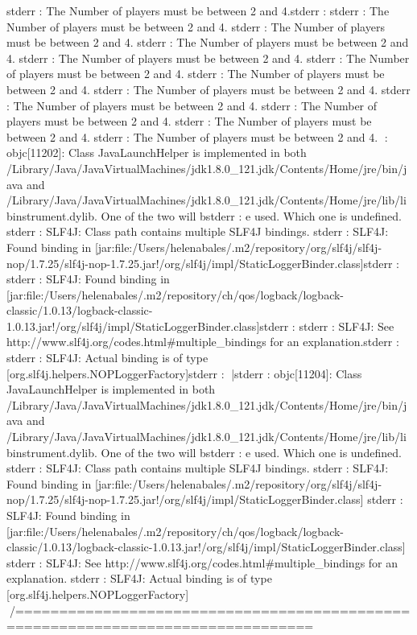 stderr  : The Number of players must be between 2 and 4.stderr  : 
stderr  : The Number of players must be between 2 and 4.
stderr  : The Number of players must be between 2 and 4.
stderr  : The Number of players must be between 2 and 4.
stderr  : The Number of players must be between 2 and 4.
stderr  : The Number of players must be between 2 and 4.
stderr  : The Number of players must be between 2 and 4.
stderr  : The Number of players must be between 2 and 4.
stderr  : The Number of players must be between 2 and 4.
stderr  : The Number of players must be between 2 and 4.
stderr  : The Number of players must be between 2 and 4.
stderr  : The Number of players must be between 2 and 4.
\stderr  : objc[11202]: Class JavaLaunchHelper is implemented in both /Library/Java/JavaVirtualMachines/jdk1.8.0_121.jdk/Contents/Home/jre/bin/java and /Library/Java/JavaVirtualMachines/jdk1.8.0_121.jdk/Contents/Home/jre/lib/libinstrument.dylib. One of the two will bstderr  : e used. Which one is undefined.
stderr  : SLF4J: Class path contains multiple SLF4J bindings.
stderr  : SLF4J: Found binding in [jar:file:/Users/helenabales/.m2/repository/org/slf4j/slf4j-nop/1.7.25/slf4j-nop-1.7.25.jar!/org/slf4j/impl/StaticLoggerBinder.class]stderr  : 
stderr  : SLF4J: Found binding in [jar:file:/Users/helenabales/.m2/repository/ch/qos/logback/logback-classic/1.0.13/logback-classic-1.0.13.jar!/org/slf4j/impl/StaticLoggerBinder.class]stderr  : 
stderr  : SLF4J: See http://www.slf4j.org/codes.html#multiple_bindings for an explanation.stderr  : 
stderr  : SLF4J: Actual binding is of type [org.slf4j.helpers.NOPLoggerFactory]stderr  : 
|stderr  : objc[11204]: Class JavaLaunchHelper is implemented in both /Library/Java/JavaVirtualMachines/jdk1.8.0_121.jdk/Contents/Home/jre/bin/java and /Library/Java/JavaVirtualMachines/jdk1.8.0_121.jdk/Contents/Home/jre/lib/libinstrument.dylib. One of the two will bstderr  : e used. Which one is undefined.
stderr  : SLF4J: Class path contains multiple SLF4J bindings.
stderr  : SLF4J: Found binding in [jar:file:/Users/helenabales/.m2/repository/org/slf4j/slf4j-nop/1.7.25/slf4j-nop-1.7.25.jar!/org/slf4j/impl/StaticLoggerBinder.class]
stderr  : SLF4J: Found binding in [jar:file:/Users/helenabales/.m2/repository/ch/qos/logback/logback-classic/1.0.13/logback-classic-1.0.13.jar!/org/slf4j/impl/StaticLoggerBinder.class]
stderr  : SLF4J: See http://www.slf4j.org/codes.html#multiple_bindings for an explanation.
stderr  : SLF4J: Actual binding is of type [org.slf4j.helpers.NOPLoggerFactory]
/================================================================================
